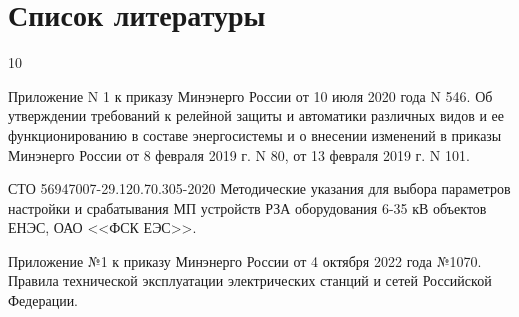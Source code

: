 {\color{unimain}\section[Список литературы]{Список литературы}}
\color{black}

\makeatletter
\providecommand{\bibsection}{}   %
\renewcommand{\bibsection}{}      %
\makeatother
\begin{thebibliography}{10}

	Приложение N 1 к приказу Минэнерго России от 10 июля 2020 года N 546. Об утверждении требований к релейной защиты и автоматики различных видов и ее функционированию в составе энергосистемы и о внесении изменений в приказы Минэнерго России от 8 февраля 2019 г. N 80, от 13 февраля 2019 г. N 101.

	СТО 56947007-29.120.70.305-2020 Методические указания для выбора параметров настройки и срабатывания МП устройств РЗА оборудования 6-35 кВ объектов ЕНЭС, ОАО <<ФСК ЕЭС>>.

	Приложение №1 к приказу Минэнерго России от 4 октября 2022 года №1070. Правила технической эксплуатации электрических станций и сетей Российской Федерации.

\end{thebibliography}